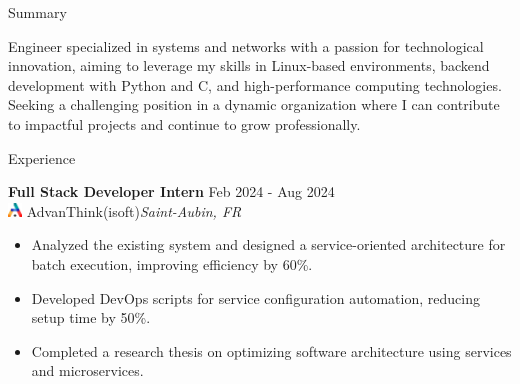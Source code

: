 \documentclass{resume}
\begin{document}
\vspace{-2em}
\begin{rSection}{Summary}

{Engineer specialized in systems and networks with a passion for technological innovation, aiming to leverage my skills in Linux-based environments, backend development with Python and C, and high-performance computing technologies. Seeking a challenging position in a dynamic organization where I can contribute to impactful projects and continue to grow professionally.}

\end{rSection}
\vspace{-0.75em}
\begin{rSection}{Experience}

    \textbf{Full Stack Developer Intern} \hfill Feb 2024 - Aug 2024\\
    \href{https://www.advanthink.com}{\includegraphics[height=1em]{../Ressource/Logo Symbol A en couleur.png}} AdvanThink(isoft)\hfill \textit{Saint-Aubin, FR}
     \begin{itemize}
        \itemsep -6pt {} 
        \item Analyzed the existing system and designed a service-oriented architecture for batch execution, improving efficiency by 60\%.
        \item Developed DevOps scripts for service configuration automation, reducing setup time by 50\%.
        \item Completed a research thesis on optimizing software architecture using services and microservices.
     \end{itemize}
    \end{rSection} 
    \vspace{-0.75em}
\end{document}
